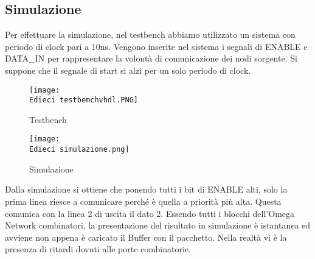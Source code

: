 \documentclass[12pt]{article}
\def \Edieci {Allegati/Esercizio10/}
\begin{document}
\subsection{Simulazione}
Per effettuare la simulazione, nel testbench abbiamo utilizzato un sistema con periodo di clock pari a 10ns. Vengono inserite nel sistema i segnali di ENABLE e DATA\_IN per rappresentare la volontà di comunicazione dei nodi sorgente. Si suppone che il segnale di start si alzi per un solo periodo di clock.
\begin{figure}[ht!]
    \centering
    \texttt{[image: \\Edieci testbemchvhdl.PNG]}    
    \caption{Testbench}
\end{figure}
\newpage
\begin{figure}[ht]
    \centering
    \texttt{[image: \\Edieci simulazione.png]}    
    \caption{Simulazione}
\end{figure}
Dalla simulazione si ottiene che ponendo tutti i bit di ENABLE alti, solo la prima linea riesce a comunicare perché è quella a priorità più alta. Questa comunica con la linea 2 di uscita il dato 2. Essendo tutti i blocchi dell’Omega Network combinatori, la presentazione del risultato in simulazione è istantanea ed avviene non appena è caricato il Buffer con il pacchetto. Nella realtà vi è la presenza di ritardi dovuti alle porte combinatorie.
\clearpage
\end{document}
